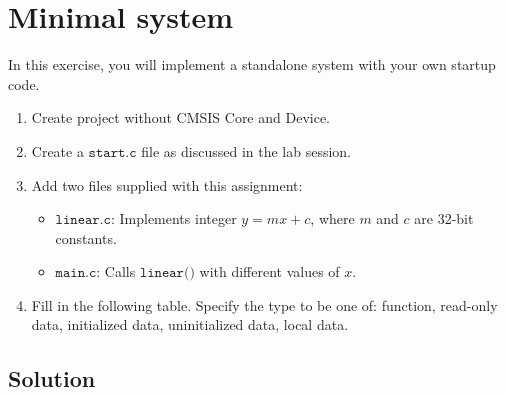 \section*{Minimal system}

In this exercise, you will implement a standalone system with your own startup code.

\begin{enumerate}[itemsep=0pt]
    \item Create project without CMSIS Core and Device.
    \item Create a \(\texttt{start.c}\) file as discussed in the lab session.
    \item Add two files supplied with this assignment:
        \begin{itemize}
            \item \(\texttt{linear.c}\): Implements integer \(y = mx + c\), where \(m\) and \(c\) are 32-bit constants.
            \item \(\texttt{main.c}\): Calls \(\texttt{linear()}\) with diﬀerent values of \(x\).
        \end{itemize}
    \item Fill in the following table.
        Specify the type to be one of:
        function, read-only data, initialized data, uninitialized data, local data.
\end{enumerate}

\subsection*{Solution}

\begin{table}[htbp]
    \centering
    
\end{table}
